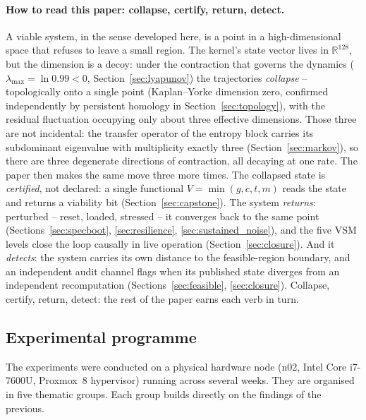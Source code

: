 \documentclass[11pt, a4paper]{article}
\newcommand{\R}{\mathbb{R}}
\begin{document}
\paragraph{How to read this paper: collapse, certify, return, detect.}
A viable system, in the sense developed here, is a point in a
high-dimensional space that refuses to leave a small region.
The kernel's state vector lives in $\R^{128}$, but the dimension is a
decoy: under the contraction that governs the dynamics
($\lambda_{\max} = \ln 0.99 < 0$, Section~\ref{sec:lyapunov}) the
trajectories \emph{collapse} -- topologically onto a single point
(Kaplan--Yorke dimension zero, confirmed independently by persistent
homology in Section~\ref{sec:topology}), with the residual fluctuation
occupying only about three effective dimensions.
Those three are not incidental: the transfer operator of the entropy
block carries its subdominant eigenvalue with multiplicity exactly three
(Section~\ref{sec:markov}), so there are three degenerate directions of
contraction, all decaying at one rate.
The paper then makes the same move three more times.
The collapsed state is \emph{certified}, not declared: a single
functional $V = \min(g, c, t, m)$ reads the state and returns a
viability bit (Section~\ref{sec:capstone}).
The system \emph{returns}: perturbed -- reset, loaded, stressed -- it
converges back to the same point
(Sections~\ref{sec:specboot}, \ref{sec:resilience},
\ref{sec:sustained_noise}), and the five VSM levels close the loop
causally in live operation (Section~\ref{sec:closure}).
And it \emph{detects}: the system carries its own distance to the
feasible-region boundary, and an independent audit channel flags when
its published state diverges from an independent recomputation
(Sections~\ref{sec:feasible}, \ref{sec:closure}).
Collapse, certify, return, detect: the rest of the paper earns each
verb in turn.

\subsection{Experimental programme}
\label{sec:programme}

The experiments were conducted on a physical hardware node (n02,
Intel Core i7-7600U, Proxmox~8 hypervisor) running across several weeks.
They are organised in five thematic groups.
Each group builds directly on the findings of the previous.
\end{document}
